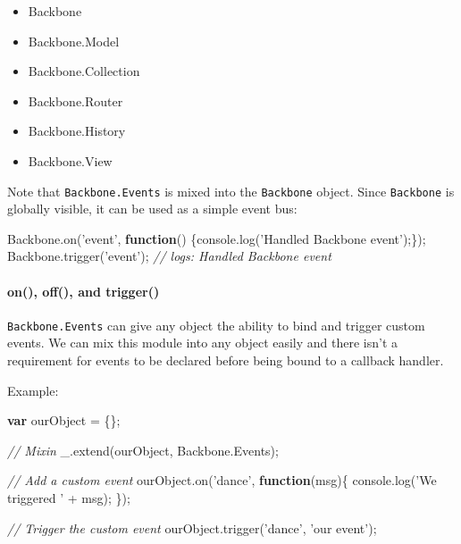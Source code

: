 \documentclass[9pt]{book}
\newenvironment{Shaded}{}{}
\newcommand{\KeywordTok}[1]{\textcolor[rgb]{0.00,0.44,0.13}{\textbf{{#1}}}}
\newcommand{\StringTok}[1]{\textcolor[rgb]{0.25,0.44,0.63}{{#1}}}
\newcommand{\CommentTok}[1]{\textcolor[rgb]{0.38,0.63,0.69}{\textit{{#1}}}}
\newcommand{\OtherTok}[1]{\textcolor[rgb]{0.00,0.44,0.13}{{#1}}}
\newcommand{\FunctionTok}[1]{\textcolor[rgb]{0.02,0.16,0.49}{{#1}}}
\newcommand{\NormalTok}[1]{{#1}}
\begin{document}
\begin{itemize}
\itemsep1pt\parskip0pt
\item
  Backbone
\item
  Backbone.Model
\item
  Backbone.Collection
\item
  Backbone.Router
\item
  Backbone.History
\item
  Backbone.View
\end{itemize}

Note that \texttt{Backbone.Events} is mixed into the \texttt{Backbone}
object. Since \texttt{Backbone} is globally visible, it can be used as a
simple event bus:

\begin{Shaded}
\begin{Highlighting}[]
\OtherTok{Backbone}\NormalTok{.}\FunctionTok{on}\NormalTok{(}\StringTok{'event'}\NormalTok{, }\KeywordTok{function}\NormalTok{() \{}\OtherTok{console}\NormalTok{.}\FunctionTok{log}\NormalTok{(}\StringTok{'Handled Backbone event'}\NormalTok{);\});}
\OtherTok{Backbone}\NormalTok{.}\FunctionTok{trigger}\NormalTok{(}\StringTok{'event'}\NormalTok{); }\CommentTok{// logs: Handled Backbone event}
\end{Highlighting}
\end{Shaded}

\paragraph{on(), off(), and trigger()}\label{on-off-and-trigger}

\texttt{Backbone.Events} can give any object the ability to bind and
trigger custom events. We can mix this module into any object easily and
there isn't a requirement for events to be declared before being bound
to a callback handler.

Example:

\begin{Shaded}
\begin{Highlighting}[]
\KeywordTok{var} \NormalTok{ourObject = \{\};}

\CommentTok{// Mixin}
\OtherTok{_}\NormalTok{.}\FunctionTok{extend}\NormalTok{(ourObject, }\OtherTok{Backbone}\NormalTok{.}\FunctionTok{Events}\NormalTok{);}

\CommentTok{// Add a custom event}
\OtherTok{ourObject}\NormalTok{.}\FunctionTok{on}\NormalTok{(}\StringTok{'dance'}\NormalTok{, }\KeywordTok{function}\NormalTok{(msg)\{}
  \OtherTok{console}\NormalTok{.}\FunctionTok{log}\NormalTok{(}\StringTok{'We triggered '} \NormalTok{+ msg);}
\NormalTok{\});}

\CommentTok{// Trigger the custom event}
\OtherTok{ourObject}\NormalTok{.}\FunctionTok{trigger}\NormalTok{(}\StringTok{'dance'}\NormalTok{, }\StringTok{'our event'}\NormalTok{);}
\end{Highlighting}
\end{Shaded}
\end{document}
